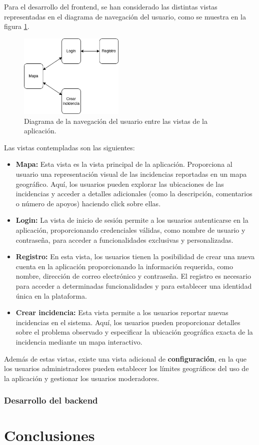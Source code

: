 \documentclass{article}
\begin{document}
Para el desarrollo del frontend, se han considerado las distintas vistas representadas en el diagrama de navegación del usuario, como se muestra en la figura \ref{fig:diagrama_navegacion_usuario}.

\begin{figure}[H]
\centering
\includegraphics[width=5cm]{images/diagrama_vistas.png}
\caption{Diagrama de la navegación del usuario entre las vistas de la aplicación.}
\label{fig:diagrama_navegacion_usuario}
\end{figure}

Las vistas contempladas son las siguientes:

\begin{itemize}
    \item \textbf{Mapa:} Esta vista es la vista principal de la aplicación. Proporciona al usuario una representación visual de las incidencias reportadas en un mapa geográfico. Aquí, los usuarios pueden explorar las ubicaciones de las incidencias y acceder a detalles adicionales (como la descripción, comentarios o número de apoyos) haciendo click sobre ellas. 
    \item \textbf{Login:} La vista de inicio de sesión permite a los usuarios autenticarse en la aplicación, proporcionando credenciales válidas, como nombre de usuario y contraseña, para acceder a funcionalidades exclusivas y personalizadas.
    \item \textbf{Registro:} En esta vista, los usuarios tienen la posibilidad de crear una nueva cuenta en la aplicación proporcionando la información requerida, como nombre, dirección de correo electrónico y contraseña. El registro es necesario para acceder a determinadas funcionalidades y para establecer una identidad única en la plataforma.
    \item \textbf{Crear incidencia:} Esta vista permite a los usuarios reportar nuevas incidencias en el sistema. Aquí, los usuarios pueden proporcionar detalles sobre el problema observado y especificar la ubicación geográfica exacta de la incidencia mediante un mapa interactivo.
\end{itemize}

Además de estas vistas, existe una vista adicional de \textbf{configuración}, en la que los usuarios administradores pueden establecer los límites geográficos del uso de la aplicación y gestionar los usuarios moderadores.

\subsubsection{Desarrollo del backend}

\newpage

\section{Conclusiones}
\end{document}
